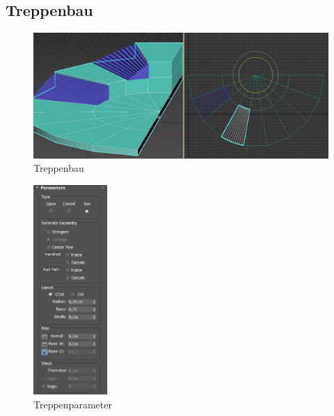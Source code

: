 \newpage
\subsection{Treppenbau}

\begin{figure}[h]
	\centering
	\includegraphics[width=0.95 \linewidth]{Abbildungen/3dsMax/Treppe_final}
	\caption{Treppenbau}
	\label{fig:Treppe}
\end{figure}

\begin{figure}
	\begin{center}
		\includegraphics[width=0.25\textwidth]{Abbildungen/3dsMax/Treppe3}
	\end{center}
	\caption{Treppenparameter}
	\label{fig:Parameter}
\end{figure}

